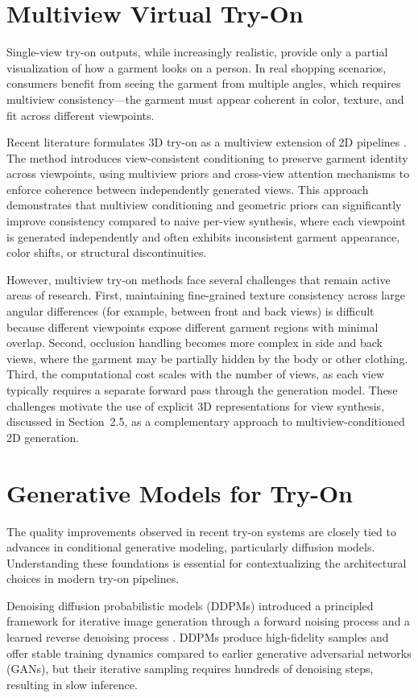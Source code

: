 \section{Multiview Virtual Try-On}
Single-view try-on outputs, while increasingly realistic, provide only a partial visualization of how a garment looks on a person. In real shopping scenarios, consumers benefit from seeing the garment from multiple angles, which requires multiview consistency—the garment must appear coherent in color, texture, and fit across different viewpoints.

Recent literature formulates 3D try-on as a multiview extension of 2D pipelines \cite{he2025vton360}. The method introduces view-consistent conditioning to preserve garment identity across viewpoints, using multiview priors and cross-view attention mechanisms to enforce coherence between independently generated views. This approach demonstrates that multiview conditioning and geometric priors can significantly improve consistency compared to naive per-view synthesis, where each viewpoint is generated independently and often exhibits inconsistent garment appearance, color shifts, or structural discontinuities.

However, multiview try-on methods face several challenges that remain active areas of research. First, maintaining fine-grained texture consistency across large angular differences (for example, between front and back views) is difficult because different viewpoints expose different garment regions with minimal overlap. Second, occlusion handling becomes more complex in side and back views, where the garment may be partially hidden by the body or other clothing. Third, the computational cost scales with the number of views, as each view typically requires a separate forward pass through the generation model. These challenges motivate the use of explicit 3D representations for view synthesis, discussed in Section~2.5, as a complementary approach to multiview-conditioned 2D generation.

\section{Generative Models for Try-On}
The quality improvements observed in recent try-on systems are closely tied to advances in conditional generative modeling, particularly diffusion models. Understanding these foundations is essential for contextualizing the architectural choices in modern try-on pipelines.

Denoising diffusion probabilistic models (DDPMs) introduced a principled framework for iterative image generation through a forward noising process and a learned reverse denoising process \cite{ho2020ddpm}. DDPMs produce high-fidelity samples and offer stable training dynamics compared to earlier generative adversarial networks (GANs), but their iterative sampling requires hundreds of denoising steps, resulting in slow inference.

